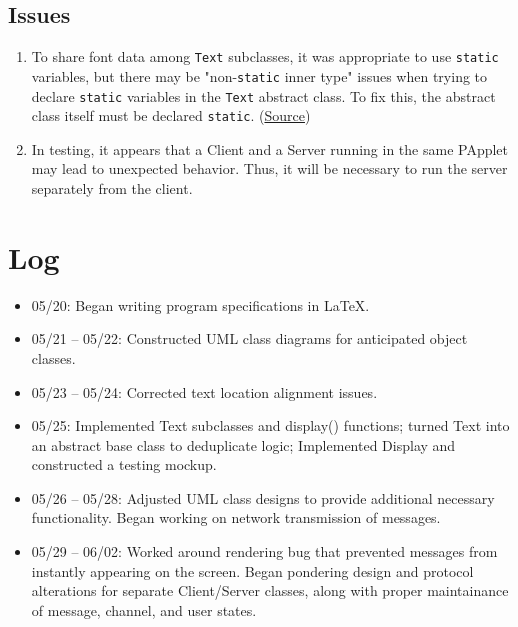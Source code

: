 \documentclass{article}
\begin{document}
\subsection{Issues}
\begin{enumerate}
    \item To share font data among \verb|Text| subclasses, it was appropriate to use \verb|static| variables, but there may be "non-\verb|static| inner type" issues when trying to declare \verb|static| variables in the \verb|Text| abstract class. To fix this, the abstract class itself must be declared \verb|static|. (\href{https://forum.processing.org/two/discussion/23623/when-creating-a-class-what-is-it-an-inner-class-of-declared-static-in-a-non-static-inner-type.html}{Source})
    \item In testing, it appears that a Client and a Server running in the same PApplet may lead to unexpected behavior. Thus, it will be necessary to run the server separately from the client.
\end{enumerate}

\section{Log}
\begin{itemize}
    \item 05/20: Began writing program specifications in \LaTeX.
    \item 05/21 -- 05/22: Constructed UML class diagrams for anticipated object classes.
    \item 05/23 -- 05/24: Corrected text location alignment issues.
    \item 05/25: Implemented Text subclasses and display() functions; turned Text into an abstract base class to deduplicate logic; Implemented Display and constructed a testing mockup.
    \item 05/26 -- 05/28: Adjusted UML class designs to provide additional necessary functionality. Began working on network transmission of messages.
    \item 05/29 -- 06/02: Worked around rendering bug that prevented messages from instantly appearing on the screen. Began pondering design and protocol alterations for separate Client/Server classes, along with proper maintainance of message, channel, and user states.
\end{itemize}
\end{document}
